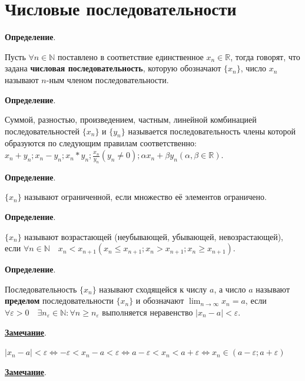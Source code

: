 \documentclass{article}
\newcommand{\parspace}{\vspace{10pt}}
\theoremstyle{break}
\begin{document}
\section{Числовые последовательности}

\textbf{Определение}.

Пусть $\forall n \in \mathbb{N}$ поставлено в соответствие единственное $x_n \in \mathbb{R}$,
тогда говорят, что задана \textbf{числовая последовательность}, которую обозначают
$\{x_n\}$, число $x_n$ называют $n$-ным членом последовательности.

\parspace

\textbf{Определение}.

Суммой, разностью, произведением, частным, линейной комбинацией последовательностей 
$\{x_n\}$ и $\{y_n\}$ называется последовательность члены которой образуются 
по следующим правилам соответственно: 
$x_n + y_n; x_n - y_n; x_n * y_n; \frac{x_n}{y_n} (y_n \ne 0); \alpha x_n + \beta y_n (\alpha, \beta \in \mathbb{R})$.

\parspace

\textbf{Определение}.

$\{x_n\}$ называют ограниченной, если множество её элементов ограничено.

\parspace

\textbf{Определение}.

$\{x_n\}$ называют возрастающей (неубывающей, убывающей, невозрастающей), если
$\forall n \in \mathbb{N} \quad x_n < x_{n + 1} (x_n \le x_{n + 1}; x_n > x_{n + 1}; x_n \ge x_{n + 1})$.

\parspace

\textbf{Определение}.

Последовательность $\{x_n\}$ называют сходящейся к числу $a$, а число $a$ называют
\textbf{пределом} последовательности $\{x_n\}$ и обозначают 
$\displaystyle\lim_{n \rightarrow \infty} x_n = a$, если 
$\forall \varepsilon > 0 \quad \exists n_\varepsilon \in \mathbb{N}: \forall n \ge n_\varepsilon$
выполняется неравенство $|x_n - a| < \varepsilon$.

\parspace

\underline{\textbf{Замечание}}.

$|x_n - a| < \varepsilon \Leftrightarrow -\varepsilon < x_n - a < \varepsilon 
\Leftrightarrow a - \varepsilon < x_n < a + \varepsilon
\Leftrightarrow x_n \in (a - \varepsilon; a + \varepsilon)$

\parspace

\underline{\textbf{Замечание}}.
\end{document}
